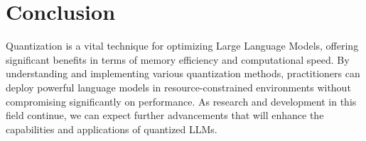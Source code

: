 \section{Conclusion}
Quantization is a vital technique for optimizing Large Language Models, offering significant benefits in terms of memory efficiency and computational speed. By understanding and implementing various quantization methods, practitioners can deploy powerful language models in resource-constrained environments without compromising significantly on performance. As research and development in this field continue, we can expect further advancements that will enhance the capabilities and applications of quantized LLMs.


